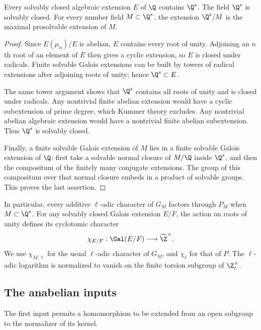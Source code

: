 \begin{lemma}\label{lem:solvable-closure}
Every solvably closed algebraic extension $E$ of $\Q$ contains $\Q^s$. The field $\Q^s$ is solvably closed. For every number field $M\subset\Q^s$, the extension $\Q^s/M$ is the maximal prosolvable extension of $M$.
\end{lemma}
\begin{proof}
Since $E(\mu_n)/E$ is abelian, $E$ contains every root of unity. Adjoining an $n$th root of an element of $E$ then gives a cyclic extension, so $E$ is closed under radicals. Finite solvable Galois extensions can be built by towers of radical extensions after adjoining roots of unity; hence $\Q^s\subset E$.

The same tower argument shows that $\Q^s$ contains all roots of unity and is closed under radicals. Any nontrivial finite abelian extension would have a cyclic subextension of prime degree, which Kummer theory excludes. Any nontrivial abelian algebraic extension would have a nontrivial finite abelian subextension. Thus $\Q^s$ is solvably closed.

Finally, a finite solvable Galois extension of $M$ lies in a finite solvable Galois extension of $\Q$: first take a solvable normal closure of $M/\Q$ inside $\Q^s$, and then the compositum of the finitely many conjugate extensions. The group of this compositum over that normal closure embeds in a product of solvable groups. This proves the last assertion.
\end{proof}

In particular, every additive $\ell$-adic character of $G_M$ factors through $P_M$ when $M\subset\Q^s$. For any solvably closed Galois extension $E/F$, the action on roots of unity defines its cyclotomic character
\[
 \chi_{E/F}:\Gal(E/F)\longrightarrow\widehat{\Z}^{\times}.
\]
We use $\chi_{M,\ell}$ for the usual $\ell$-adic character of $G_M$, and $\chi_\ell$ for that of $P$. The $\ell$-adic logarithm is normalized to vanish on the finite torsion subgroup of $\Z_\ell^\times$.

\subsection{The anabelian inputs}
The first input permits a homomorphism to be extended from an open subgroup to the normalizer of its kernel.

